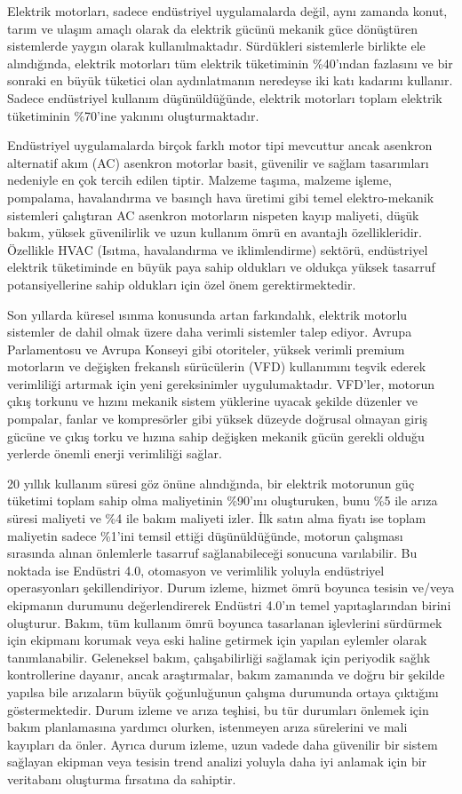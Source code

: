 Elektrik motorları, sadece endüstriyel uygulamalarda değil, aynı zamanda konut, tarım ve ulaşım amaçlı olarak da elektrik gücünü mekanik güce dönüştüren sistemlerde yaygın olarak kullanılmaktadır. Sürdükleri sistemlerle birlikte ele alındığında, elektrik motorları tüm elektrik tüketiminin \%40'ından fazlasını ve bir sonraki en büyük tüketici olan aydınlatmanın neredeyse iki katı kadarını kullanır. Sadece endüstriyel kullanım düşünüldüğünde, elektrik motorları toplam elektrik tüketiminin \%70'ine yakınını oluşturmaktadır.

Endüstriyel uygulamalarda birçok farklı motor tipi mevcuttur ancak asenkron alternatif akım (AC) asenkron motorlar basit, güvenilir ve sağlam tasarımları nedeniyle en çok tercih edilen tiptir. Malzeme taşıma, malzeme işleme, pompalama, havalandırma ve basınçlı hava üretimi gibi temel elektro-mekanik sistemleri çalıştıran AC asenkron motorların nispeten kayıp maliyeti, düşük bakım, yüksek güvenilirlik ve uzun kullanım ömrü en avantajlı özellikleridir. Özellikle HVAC (Isıtma, havalandırma ve iklimlendirme) sektörü, endüstriyel elektrik tüketiminde en büyük paya sahip oldukları ve oldukça yüksek tasarruf potansiyellerine sahip oldukları için özel önem gerektirmektedir.

Son yıllarda küresel ısınma konusunda artan farkındalık, elektrik motorlu sistemler de dahil olmak üzere daha verimli sistemler talep ediyor. Avrupa Parlamentosu ve Avrupa Konseyi gibi otoriteler, yüksek verimli premium motorların ve değişken frekanslı sürücülerin (VFD) kullanımını teşvik ederek verimliliği artırmak için yeni gereksinimler uygulumaktadır. VFD'ler, motorun çıkış torkunu ve hızını mekanik sistem yüklerine uyacak şekilde düzenler ve pompalar, fanlar ve kompresörler gibi yüksek düzeyde doğrusal olmayan giriş gücüne ve çıkış torku ve hızına sahip değişken mekanik gücün gerekli olduğu yerlerde önemli enerji verimliliği sağlar. 

20 yıllık kullanım süresi göz önüne alındığında, bir elektrik motorunun güç tüketimi toplam sahip olma maliyetinin \%90'ını oluşturuken, bunu \%5 ile arıza süresi maliyeti ve \%4 ile bakım maliyeti izler. İlk satın alma fiyatı ise toplam maliyetin sadece \%1'ini temsil ettiği düşünüldüğünde, motorun çalışması sırasında alınan önlemlerle tasarruf sağlanabileceği sonucuna varılabilir. Bu noktada ise Endüstri 4.0, otomasyon ve verimlilik yoluyla endüstriyel operasyonları şekillendiriyor. Durum izleme, hizmet ömrü boyunca tesisin ve/veya ekipmanın durumunu değerlendirerek Endüstri 4.0'ın temel yapıtaşlarından birini oluşturur. Bakım, tüm kullanım ömrü boyunca tasarlanan işlevlerini sürdürmek için ekipmanı korumak veya eski haline getirmek için yapılan eylemler olarak tanımlanabilir. Geleneksel bakım, çalışabilirliği sağlamak için periyodik sağlık kontrollerine dayanır, ancak araştırmalar, bakım zamanında ve doğru bir şekilde yapılsa bile arızaların büyük çoğunluğunun çalışma durumunda ortaya çıktığını göstermektedir. Durum izleme ve arıza teşhisi, bu tür durumları önlemek için bakım planlamasına yardımcı olurken, istenmeyen arıza sürelerini ve mali kayıpları da önler. Ayrıca durum izleme, uzun vadede daha güvenilir bir sistem sağlayan ekipman veya tesisin trend analizi yoluyla daha iyi anlamak için bir veritabanı oluşturma fırsatına da sahiptir.

